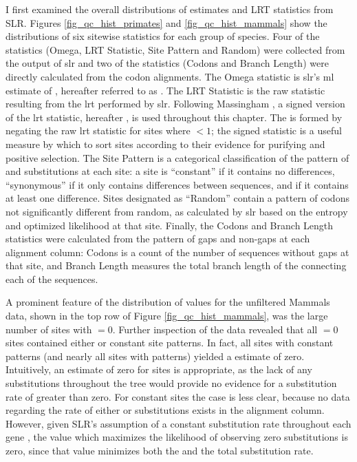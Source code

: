 I first examined the overall distributions of \omg estimates and \sw
LRT statistics from SLR. Figures \ref{fig_qc_hist_primates} and
\ref{fig_qc_hist_mammals} show the distributions of six sitewise
statistics for each group of species. Four of the statistics (Omega,
LRT Statistic, Site Pattern and Random) were collected from the output
of \ac{slr} and two of the statistics (\Ngap Codons and \Ngap Branch
Length) were directly calculated from the codon alignments. The Omega
statistic is \ac{slr}'s \ac{ml} estimate of \omg, hereafter referred
to as \omgml. The LRT Statistic is the raw statistic resulting from
the \sw \ac{lrt} performed by \ac{slr}. Following Massingham
\citeyearpar{Massingham2005}, a signed version of the \ac{lrt}
statistic, hereafter \slrt, is used throughout this chapter. The \slrt
is formed by negating the raw \ac{lrt} statistic for sites where
\omgml$<1$; the signed statistic is a useful measure by which to sort
sites according to their evidence for purifying and positive
selection. The Site Pattern is a categorical classification of the
pattern of \syn and \nsyn substitutions at each site: a site is
``constant'' if it contains no differences, ``synonymous'' if it only
contains \syn differences between sequences, and \nsyn if it contains
at least one \nsyn difference. Sites designated as ``Random'' contain
a pattern of codons not significantly different from random, as
calculated by \ac{slr} based on the entropy and optimized likelihood
at that site. Finally, the \Ngap Codons and \Ngap Branch Length
statistics were calculated from the pattern of gaps and non-gaps at
each alignment column: \Ngap Codons is a count of the number of
sequences without gaps at that site, and \Ngap Branch Length measures
the total branch length of the \subtr connecting each of the \ngap
sequences.

A prominent feature of the distribution of \omgml values for the
unfiltered Mammals data, shown in the top row of Figure
\ref{fig_qc_hist_mammals}, was the large number of sites with
\omgml$=0$. Further inspection of the data revealed that all
\omgml$=0$ sites contained either \syn or constant site patterns. In
fact, all sites with constant patterns (and nearly all sites with \syn
patterns) yielded a \omgml estimate of zero. Intuitively, an estimate
of zero for \syn sites is appropriate, as the lack of any \nsyn
substitutions throughout the tree would provide no evidence for a
\nsyn substitution rate of greater than zero. For constant sites the
case is less clear, because no data regarding the rate of either \syn
or \nsyn substitutions exists in the alignment column. However, given
SLR's assumption of a constant \syn substitution rate throughout each
gene \citep{Massingham2005}, the \omg value which maximizes the
likelihood of observing zero substitutions is zero, since that value
minimizes both the \nsyn and the total substitution rate.

